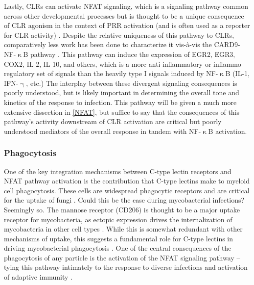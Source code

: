 Lastly, CLRs can activate NFAT signaling, which is a signaling pathway common across other developmental processes but is thought to be a unique consequence of CLR agonism in the context of PRR activation (and is often used as a reporter for CLR activity) \citep{Wilkins2004, Chow1999, Jauliac2002, Aramburu1998, HannantaAnan2016, Hooijberg2000, Goodridge2007, Goodridge2008, Bendickova2020, Fuller2007, Zhao2014}. Despite the relative uniqueness of this pathway to CLRs, comparatively less work has been done to characterize it vis\hyp{}\`{a}\hyp{}vis the CARD9\hyp{}NF\hyp{}$\upkappa$B pathway \citep{Goodridge2007, Goodridge2009, Deerhake2021}. This pathway can induce the expression of EGR2, EGR3, COX2, IL\hyp{}2, IL\hyp{}10, and others, which is a more anti\hyp{}inflammatory or inflammo\hyp{}regulatory set of signals than the heavily type I signals induced by NF\hyp{}$\upkappa$B (IL\hyp{}1, IFN\hyp{}$\upgamma$, etc.) The interplay between these divergent signaling consequences is poorly understood, but is likely important in determining the overall tone and kinetics of the response to infection. This pathway will be given a much more extensive dissection in \autoref{NFAT}, but suffice to say that the consequences of this pathway's activity downstream of CLR activation are critical but poorly understood mediators of the overall response in tandem with NF-$\upkappa$B activation.

\subsubsection{Phagocytosis}

One of the key integration mechanisms between C\hyp{}type lectin receptors and NFAT pathway activation is the contribution that C\hyp{}type lectins make to myeloid cell phagocytosis. These cells are widespread phagocytic receptors and are critical for the uptake of fungi \citep{Robinson2006}. Could this be the case during mycobacterial infections? Seemingly so. The mannose receptor (CD206) is thought to be a major uptake receptor for mycobacteria, as ectopic expression drives the internalization of mycobacteria in other cell types \citep{Schlesinger1993}. While this is somewhat redundant with other mechanisms of uptake, this suggests a fundamental role for C\hyp{}type lectins in driving mycobacterial phagocytosis \citep{Ernst1998}. One of the central consequences of the phagocytosis of any particle is the activation of the NFAT signaling pathway -- tying this pathway intimately to the response to diverse infections and activation of adaptive immunity \citep{Khameneh2017}. 

